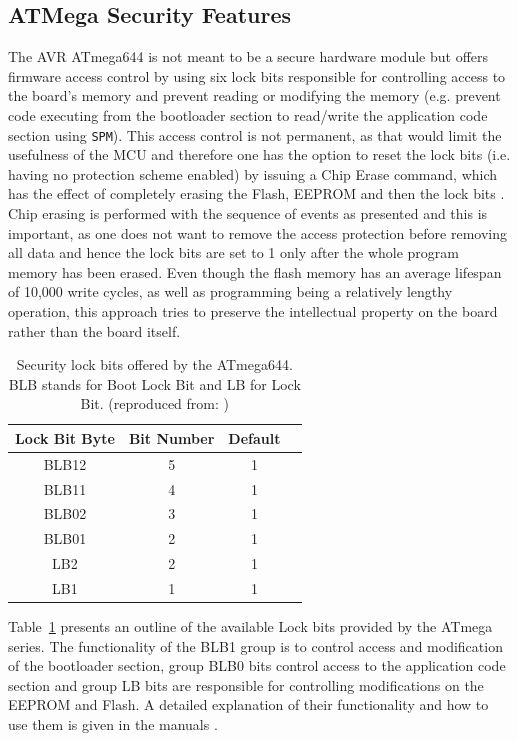 	\subsection{ATMega Security Features}
	
	The AVR ATmega644 is not meant to be a secure hardware module but offers firmware access control by using six lock bits responsible for controlling access to the board's memory and prevent reading or modifying the memory (e.g. prevent code executing from the bootloader section to read/write the application code section using \texttt{SPM}). This access control is not permanent, as that would limit the usefulness of the MCU and therefore one has the option to reset the lock bits (i.e. having no protection scheme enabled) by issuing a Chip Erase command, which has the effect of completely erasing the Flash, EEPROM and then the lock bits \citep{atmega_manual}. Chip erasing is performed with the sequence of events as presented and this is important, as one does not want to remove the access protection before removing all data and hence the lock bits are set to 1 only after the whole program memory has been erased. Even though the flash memory has an average lifespan of 10,000 write cycles, as well as programming being a relatively lengthy operation, this approach tries to preserve the intellectual property on the board rather than the board itself.
	
	\begin{table}
		\caption{\footnotesize Security lock bits offered by the ATmega644. BLB stands for Boot Lock Bit and LB for Lock Bit. (reproduced from: \protect\citep{tech:avrfreaks} \citep{atmega_manual})}
		\label{table:lock_bits}
		\center
		\begin{tabular}{| c | c | c | c |}
			\hline
			\textbf{Lock Bit Byte} & \textbf{Bit Number} & \textbf{Default}\\
			\hline \hline
			BLB12 & 5 & 1\\
			BLB11 & 4 & 1\\
			BLB02 & 3 & 1\\
			BLB01 & 2 & 1\\
			LB2 & 2 & 1 \\
			LB1 & 1 & 1 \\
			\hline
		\end{tabular}
		
	\end{table}
	
Table~\ref{table:lock_bits} presents an outline of the available Lock bits provided by the ATmega series. The functionality of the BLB1 group is to control access and modification of the bootloader section, group BLB0 bits control access to the application code section and group LB bits are responsible for controlling modifications on the EEPROM and Flash. A detailed explanation of their functionality and how to use them is given in the manuals \citep{atmega_manual} \citep{tech:avrfreaks}.
	